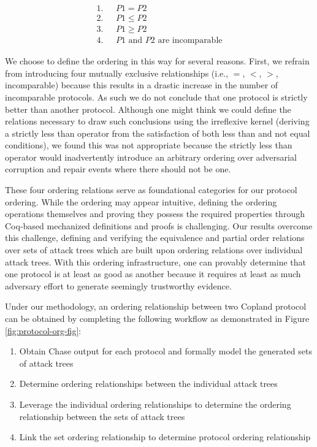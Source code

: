 \documentclass[runningheads]{llncs}
\theoremstyle{definition}
\newcommand{\squash}{\itemsep=0pt\parskip=0pt}
\begin{document}
\vspace*{-5mm}

\begin{align*}
1. & \text{ } P1 = P2 \\
2. & \text{ } P1 \le P2 \\
3. & \text{ } P1 \ge P2 \\
4. & \text{ } P1 \text{ and } P2 \text{ are incomparable}
\end{align*}

\noindent We choose to define the ordering in this way for several
reasons. First, we refrain from introducing four mutually exclusive
relationships (i.e., $=$, $<$, $>$, incomparable) because this results
in a drastic increase in the number of incomparable protocols. As such
we do not conclude that one protocol is strictly better than another
protocol. Although one might think we could define the relations
necessary to draw such conclusions using the irreflexive kernel
(deriving a strictly less than operator from the satisfaction of both
less than and not equal conditions), we found this was not appropriate
because the strictly less than operator would inadvertently introduce
an arbitrary ordering over adversarial corruption and repair events
where there should not be one.


These four ordering relations serve as foundational categories for our
protocol ordering. While the ordering may appear intuitive, defining
the ordering operations themselves and proving they possess the
required properties through Coq-based mechanized definitions and
proofs is challenging. Our results overcome this challenge, defining
and verifying the equivalence and partial order relations over sets of
attack trees which are built upon ordering relations over individual
attack trees. With this ordering infrastructure, one can provably
determine that one protocol is at least as good as another because it
requires at least as much adversary effort to generate seemingly
trustworthy evidence. 

Under our methodology, an ordering relationship between two Copland
protocol can be obtained by completing the following workflow as
demonstrated in Figure  \ref{fig:protocol-org-fig}: 

\begin{enumerate}
    \squash
    \item Obtain Chase output for each protocol and formally model the generated sets of attack trees
    \item Determine ordering relationships between the individual attack trees
    \item Leverage the individual ordering relationships to determine the ordering relationship between the sets of attack trees
    \item Link the set ordering relationship to determine protocol ordering relationship
\end{enumerate}
\end{document}
